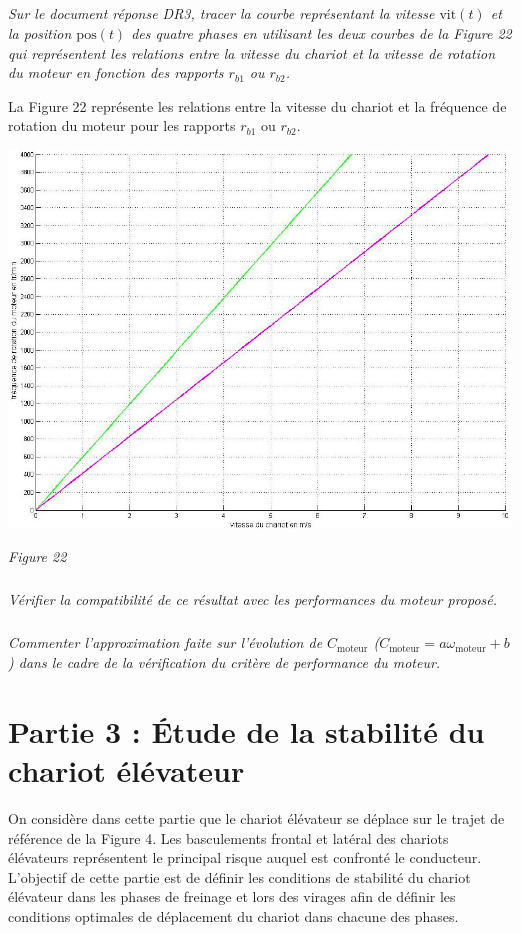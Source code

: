 \documentclass[10pt,fleqn]{article} %
\begin{document}
\subparagraph{}
\textit{Sur le document réponse DR3, tracer la courbe représentant la vitesse $\text{vit}(t)$ et la position $\text{pos}(t)$ des quatre phases en utilisant les deux courbes de la Figure 22 qui représentent les relations entre la vitesse du chariot et la vitesse de rotation du moteur en fonction des rapports $r_{b1}$ ou $r_{b2}$.}

La Figure 22 représente les relations entre la vitesse du chariot et la fréquence de rotation du moteur pour les rapports $r_{b1}$ ou $r_{b2}$.



\begin{center}
\includegraphics[width=.6\linewidth]{images/fig_22}

\textit{Figure 22}
\end{center}

\subparagraph{}
\textit{Vérifier la compatibilité de ce résultat avec les performances du moteur proposé.}

\subparagraph{}
\textit{Commenter l’approximation faite sur l’évolution de $C_{\text{moteur}}$ ($C_{\text{moteur}} = a \omega_{\text{moteur}}+b$) dans le cadre de la vérification du critère de performance du moteur.}

\section{Partie 3 : Étude de la stabilité du chariot élévateur}

On considère dans cette partie que le chariot élévateur se déplace sur le trajet de référence de la Figure 4. Les basculements frontal et latéral des chariots élévateurs représentent le principal risque auquel est confronté le conducteur. L’objectif de cette partie est de définir les conditions de stabilité du chariot élévateur dans les phases de freinage et lors des virages afin de définir les conditions optimales de déplacement du chariot dans chacune des phases.
\end{document}

